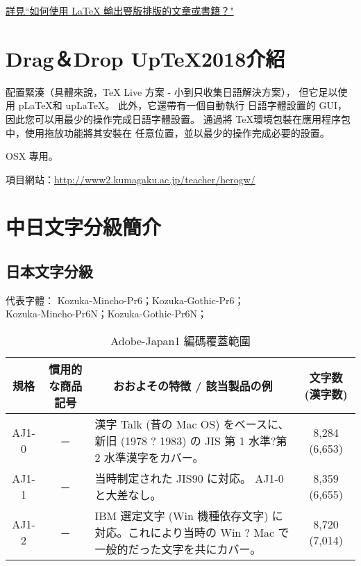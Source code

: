 \begin{appendix}
\mcfamily

\par\href{https://www.zhihu.com/question/20544732/answer/15437234}%
{詳見``如何使用 LaTeX 輸出豎版排版的文章或書籍？"}

\section{ Drag＆Drop Up\TeX 2018介紹}\label{uptex-xiongben}

配置緊湊（具體來說，TeX Live 方案 - 小到只收集日語解決方案），
但它足以使用 p\LaTeX 和 up\LaTeX。 此外，它還帶有一個自動執行
日語字體設置的 GUI，因此您可以用最少的操作完成日語字體設置。
通過將 \TeX 環境包裝在應用程序包中，使用拖放功能將其安裝在
任意位置，並以最少的操作完成必要的設置。

{\mcfamily\mdseries{} OSX 專用。}

項目網站：\url{http://www2.kumagaku.ac.jp/teacher/herogw/}

\clearpage
\section{中日文字分級簡介}
\subsection{日本文字分級}
{\gtfamily
代表字體： Kozuka-Mincho-Pr6；Kozuka-Gothic-Pr6；\\
\qquad \qquad \qquad Kozuka-Mincho-Pr6N；Kozuka-Gothic-Pr6N；}

\begin{table}[h]
\caption{\fontsize{12pt}{15pt}\selectfont Adobe-Japan1 編碼覆蓋範圍} %
\centering %
\begin{tabular}{|c|c|p{8cm}|c|}%
\hline  %

規格 & 慣用的な商品記号	& \multicolumn{1}{|c|}{おおよその特徴 / 該当製品の例} & 文字数(漢字数) \\

\hline  %
AJ1-0 &	─	 & 漢字 Talk (昔の Mac OS)
をベースに、新旧 (1978 ? 1983) の JIS 第 1 水準?第 2 水準漢字をカバー。
& 8,284 (6,653) \\
\hline
AJ1-1	& ─ &	当時制定された JIS90 に対応。
AJ1-0 と大差なし。 & 	8,359 (6,655) \\
\hline
AJ1-2	& ─	 &  IBM 選定文字 (Win 機種依存文字)
に対応。これにより当時の Win ? Mac で一般的だった文字を共にカバー。
& 	8,720 (7,014) \\
\hline


\end{tabular}
\end{table}
\end{appendix}
